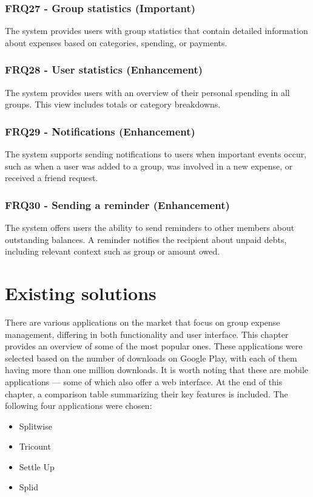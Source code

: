 \documentclass{ctuthesis}
\begin{document}
\subsubsection{FRQ27 - Group statistics (Important)} 
The system provides users with group statistics that contain detailed information about expenses based on categories, spending, or payments.

\subsubsection{FRQ28 - User statistics (Enhancement)}
The system provides users with an overview of their personal spending in all groups. This view includes totals or category breakdowns.

\subsubsection{\label{frq:29}FRQ29 - Notifications (Enhancement)}
The system supports sending notifications to users when important events occur, such as when a user was added to a group, was involved in a new expense, or received a friend request.

\subsubsection{\label{frq:30}FRQ30 - Sending a reminder (Enhancement)}
The system offers users the ability to send reminders to other members about outstanding balances. A reminder notifies the recipient about unpaid debts, including relevant context such as group or amount owed.

\section{Existing solutions}
There are various applications on the market that focus on group expense management, differing in both functionality and user interface. This chapter provides an overview of some of the most popular ones. These applications were selected based on the number of downloads on Google Play, with each of them having more than one million downloads. It is worth noting that these are mobile applications — some of which also offer a web interface. At the end of this chapter, a comparison table summarizing their key features is included. The following four applications were chosen:
\begin{itemize}
    \item Splitwise
    \item Tricount
    \item Settle Up
    \item Splid
\end{itemize}
\end{document}
